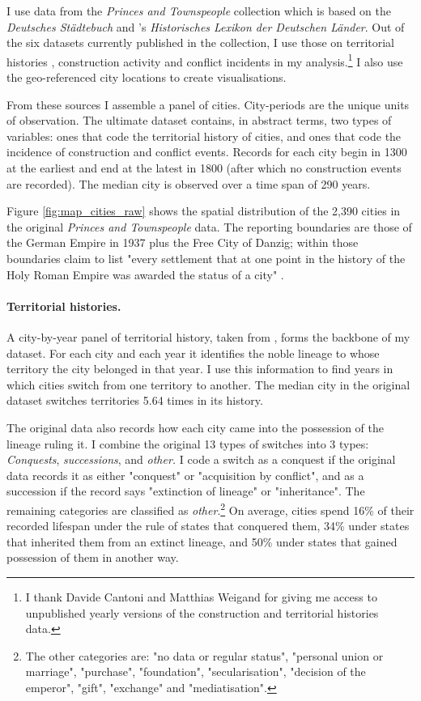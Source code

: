 \documentclass[11pt, a4paper]{article}
\begin{document}
I use data from the \textit{Princes and Townspeople} collection which is based on the \textit{Deutsches Städtebuch} \citep{keyser1939} and \cite{kobler2007}'s \textit{Historisches Lexikon der Deutschen Länder}. Out of the six datasets currently published in the collection, I use those on territorial histories \citep{pt2}, construction activity \citep{pt5} and conflict incidents \citep{pt6} in my analysis.\footnote{I thank Davide Cantoni and Matthias Weigand for giving me access to unpublished yearly versions of the construction and territorial histories data.} I also use the geo-referenced city locations \citep{pt1} to create visualisations. 

From these sources I assemble a panel of cities. City-periods are the unique units of observation. The ultimate dataset contains, in abstract terms, two types of variables: ones that code the territorial history of cities, and ones that code the incidence of construction and conflict events. Records for each city begin in 1300 at the earliest and end at the latest in 1800 (after which no construction events are recorded). The median city is observed over a time span of 290 years.

Figure \ref{fig:map_cities_raw} shows the spatial distribution of the 2,390 cities in the original \textit{Princes and Townspeople} data. The reporting boundaries are those of the German Empire in 1937 plus the Free City of Danzig; within those boundaries \cite{keyser1939} claim to list "every settlement that at one point in the history of the Holy Roman Empire was awarded the status of a city" \citep[p. 2]{pt1}.

\paragraph{Territorial histories.} 

A city-by-year panel of territorial history, taken from \cite{pt2}, forms the backbone of my dataset. For each city and each year it identifies the noble lineage to whose territory the city belonged in that year. I use this information to find years in which cities switch from one territory to another. The median city in the original dataset switches territories 5.64 times in its history. 

The original data also records how each city came into the possession of the lineage ruling it. I combine the original 13 types of switches into 3 types: \textit{Conquests}, \textit{successions}, and \textit{other.} I code a switch as a conquest if the original data records it as either "conquest" or "acquisition by conflict", and as a succession if the record says "extinction of lineage" or "inheritance". The remaining categories are classified as \textit{other}.\footnote
{
The other categories are: "no data or regular status", "personal union or marriage", "purchase", "foundation", "secularisation", "decision of the emperor", "gift", "exchange" and "mediatisation".
} 
On average, cities spend 16\% of their recorded lifespan under the rule of states that conquered them, 34\% under states that inherited them from an extinct lineage, and 50\% under states that gained possession of them in another way.
\end{document}
